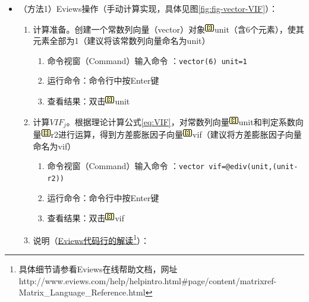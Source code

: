 \documentclass[12pt,(landscape,a4paper),(portrait,a4paper)]{article}
\providecommand{\tightlist}{%
  \setlength{\itemsep}{0pt}\setlength{\parskip}{0pt}}
\let\rmarkdownfootnote\footnote%
\def\footnote{\protect\rmarkdownfootnote}
\begin{document}
\begin{itemize}
\tightlist
\item
  （方法1）Eviews操作（手动计算实现，具体见图\ref{fig:fig-vector-VIF}）：

  \begin{enumerate}
  \def\labelenumi{\arabic{enumi})}
  \tightlist
  \item
    计算准备。创建一个常数列向量（vector）对象\includegraphics{picture/object/Vector.png}unit（含6个元素），使其元素全部为1（建议将该常数列向量命名为unit）

    \begin{enumerate}
    \def\labelenumii{\alph{enumii}.}
    \tightlist
    \item
      命令视窗（Command）输入命令 ：\texttt{vector(6)\ unit=1}
    \item
      运行命令：命令行中按Enter键
    \item
      查看结果：双击\includegraphics{picture/object/Vector.png}unit\\
    \end{enumerate}
  \item
    计算\(VIF_j\)。根据理论计算公式\eqref{eq:VIF}，对常数列向量\includegraphics{picture/object/Vector.png}unit和判定系数向量\includegraphics{picture/object/Vector.png}r2进行运算，得到方差膨胀因子向量\includegraphics{picture/object/Vector.png}vif（建议将方差膨胀因子向量命名为vif）

    \begin{enumerate}
    \def\labelenumii{\alph{enumii}.}
    \tightlist
    \item
      命令视窗（Command）输入命令
      ：\texttt{vector\ vif=@ediv(unit,(unit-r2))}
    \item
      运行命令：命令行中按Enter键
    \item
      查看结果：双击\includegraphics{picture/object/Vector.png}vif\\
    \end{enumerate}
  \item
    说明（\href{http://www.eviews.com/help/helpintro.html\#page/content/matrixref-Matrix_Language_Reference.html}{Eviews代码行的解读}\footnote{具体细节请参看Eviews在线帮助文档，网址http://www.eviews.com/help/helpintro.html\#page/content/matrixref-Matrix\_Language\_Reference.html}）：


\end{enumerate}
\end{itemize}
\end{document}

